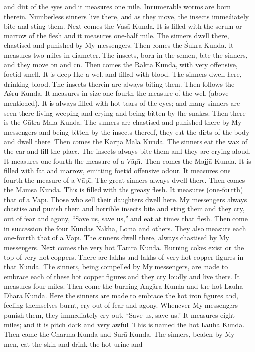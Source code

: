 and dirt of the eyes and it measures one mile. Innumerable worms are born therein. Numberless sinners live there, and as they move, the insects immediately bite and sting them. Next comes the Vas\=a Kunda. It is filled with the serum or marrow of the flesh and it measures one-half mile. The sinners dwell there, chastised and punished by My messengers. Then comes the \'Sukra Kunda. It measures two miles in diameter. The insects, born in the semen, bite the sinners, and they move on and on. Then comes the Rakta Kunda, with very offensive, foetid smell. It is deep like a well and filled with blood. The sinners dwell here, drinking blood. The insects therein are always biting them. Then follows the A\'sru Kunda. It measures in size one fourth the measure of the well (above-mentioned). It is always filled with hot tears of the eyes; and many sinners are seen there living weeping and crying and being bitten by the snakes. Then there is the G\=atra Mala Kunda. The sinners are chastised and punished there by My messengers and being bitten by the insects thereof, they eat the dirts of the body and dwell there. Then comes the Kar\d{n}a Mala Kunda. The sinners eat the wax of the ear and fill the place. The insects always bite them and they are crying aloud. It measures one fourth the measure of a V\=ap\={\i}. Then comes the Majj\=a Kunda. It is filled with fat and marrow, emitting foetid offensive odour. It measures one fourth the measure of a V\=ap\={\i}. The great sinners always dwell there. Then comes the M\=amsa Kunda. This is filled with the greasy flesh. It measures (one-fourth) that of a V\=ap\={\i}. Those who sell their daughters dwell here. My messengers always chastise and punish them and horrible insects bite and sting them and they cry, out of fear and agony, ``Save us, save us,'' and eat at times that flesh. Then come in succession the four Kundas Nakha, Loma and others. They also measure each one-fourth that of a V\=ap\={\i}. The sinners dwell there, always chastised by My messengers. Next comes the very hot T\=amra Kunda. Burning cokes exist on the top of very hot coppers. There are lakhs and lakhs of very hot copper figures in that Kunda. The sinners, being compelled by My messengers, are made to embrace each of these hot copper figures and they cry loudly and live there. It measures four miles. Then come the burning Ang\=ara Kunda and the hot Lauha Dh\=ara Kunda. Here the sinners are made to embrace the hot iron figures and, feeling themselves burnt, cry out of fear and agony. Whenever My messengers punish them, they immediately cry out, ``Save us, save us.'' It measures eight miles; and it is pitch dark and very awful. This is named the hot Lauha Kunda. Then come the Charma Kunda and Sur\=a Kunda. The sinners, beaten by My men, eat the skin and drink the hot urine and

